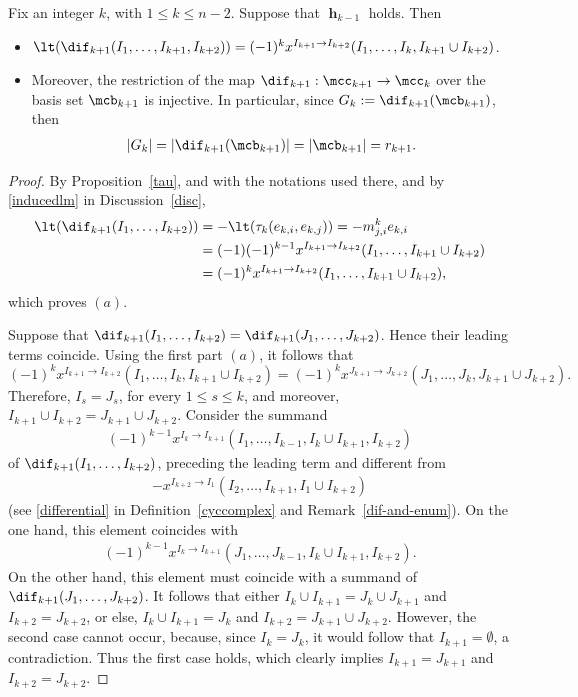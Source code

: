 \begin{corollary}\label{ltbij}
Fix an integer $k$, with $1\leq k\leq n-2$. Suppose that $\mbfh_{k-1}$
holds. Then 
\begin{itemize}
\item[$(a)$]
  $\lt(\dif_{k+1}(I_1,\ldots,I_{k+1},I_{k+2}))=(-1)^{k}x^{I_{k+1}\to
  I_{k+2}}(I_1,\ldots, I_{k},I_{k+1}\cup I_{k+2})$.
\item[$(b)$] Moreover, the restriction of the map
  $\dif_{k+1}:\mcc_{k+1}\to\mcc_{k}$ over the basis set $\mcb_{k+1}$
  is injective. In particular, since $G_k:=\dif_{k+1}(\mcb_{k+1})$,
  then 
\begin{eqnarray*}
\lvert
G_k\rvert=\lvert\dif_{k+1}(\mcb_{k+1})\rvert=
\lvert\mcb_{k+1}\rvert=r_{k+1}.
\end{eqnarray*}
\end{itemize}
\end{corollary}
\begin{proof}
By Proposition~\ref{tau}, and with the notations used there, and by
\eqref{inducedlm} in Discussion~\ref{disc},
\begin{align*}
\lt(\dif_{k+1}(I_1,\ldots,I_{k+2}))&=-\lt(\tau_{k}(e_{k,i},e_{k,j}))
=-m^{k}_{j,i}e_{k,i}
\\ &= (-1)(-1)^{k-1}x^{I_{k+1}\to I_{k+2}}(I_1,\ldots,
I_{k+1}\cup I_{k+2})\\
&= (-1)^{k}x^{I_{k+1}\to I_{k+2}}(I_1,\ldots,
I_{k+1}\cup I_{k+2}),
\end{align*}
which proves $(a)$.

Suppose that $\dif_{k+1}(I_1,\ldots ,I_{k+2})=\dif_{k+1}(J_1,\ldots
,J_{k+2})$. Hence their leading terms coincide. Using the first part
$(a)$, it follows that
\[
 (-1)^{k}x^{I_{k+1}\to I_{k+2}}(I_1,\ldots,I_{k},I_{k+1}\cup
  I_{k+2})\!=\! (-1)^{k}x^{J_{k+1}\to
    J_{k+2}}(J_1,\ldots,J_{k},J_{k+1}\cup J_{k+2}).
\]
Therefore, $I_s=J_s$, for every $1\leq s\leq k$, and moreover,
$I_{k+1}\cup I_{k+2}=J_{k+1}\cup J_{k+2}$. Consider the summand
\begin{eqnarray*}
(-1)^{k-1}x^{I_{k}\to I_{k+1}}(I_1,\ldots ,I_{k-1},I_{k}\cup
  I_{k+1},I_{k+2})
\end{eqnarray*} 
of $\dif_{k+1}(I_1,\ldots ,I_{k+2})$, preceding the leading term and
different from 
\begin{eqnarray*}
-x^{I_{k+2}\to I_1}(I_2,\ldots ,I_{k+1},I_1\cup I_{k+2})
\end{eqnarray*}
(see \eqref{differential} in Definition~\ref{cyccomplex} and
Remark~\ref{dif-and-enum}). On the one hand, this element coincides
with
\begin{eqnarray*}
(-1)^{k-1}x^{I_{k}\to I_{k+1}}(J_1,\ldots ,J_{k-1},I_{k}\cup
  I_{k+1},I_{k+2}). 
\end{eqnarray*}
On the other hand, this element must coincide with a summand of
$\dif_{k+1}(J_1,\ldots ,J_{k+2})$. It follows that either $I_{k}\cup
I_{k+1}=J_{k}\cup J_{k+1}$ and $I_{k+2}=J_{k+2}$, or else, $I_{k}\cup
I_{k+1}=J_{k}$ and $I_{k+2}=J_{k+1}\cup J_{k+2}$. However, the second
case cannot occur, because, since $I_{k}=J_{k}$, it would follow that
$I_{k+1}=\emptyset$, a contradiction. Thus the first case holds, which
clearly implies $I_{k+1}=J_{k+1}$ and $I_{k+2}=J_{k+2}$.
\end{proof}

